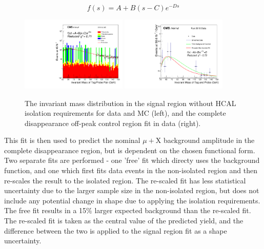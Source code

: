 \begin{equation} 
    \label{eq:bkgfunc}
    f(s)=A+B(s-C)e^{-Ds} 
\end{equation}

\begin{figure}[htp]
    \centering
    \includegraphics[width=0.45\textwidth]{figures/offPeakCr_noIso.pdf}
    \hspace{0.01\textwidth}
    \includegraphics[width=0.45\textwidth]{figures/offPeakCr_fit.pdf} 
     \caption[$\mu$+X background fits in the off-peak control region]{The invariant mass distribution in the signal region without HCAL isolation requirements for data and MC (left), and the complete disappearance off-peak control region fit in data (right).}
    \label{fig:offpeakfit}
 \end{figure}
 

This fit is then used to predict the nominal $\mu+$X background amplitude in the complete disappearance region, but is dependent on the chosen functional form. 
Two separate fits are performed - one 'free' fit which directy uses the background function, and one which first fits data events in the non-isolated region and then re-scales the result to the isolated region. 
The re-scaled fit has less statistical uncertainty due to the larger sample size in the non-isolated region, but does not include any potential change in shape due to applying the isolation requirements. 
The free fit results in a 15$\%$ larger expected background than the re-scaled fit. 
The re-scaled fit is taken as the central value of the predicted yield, and the difference between the two is applied to the signal region fit as a shape uncertainty.

